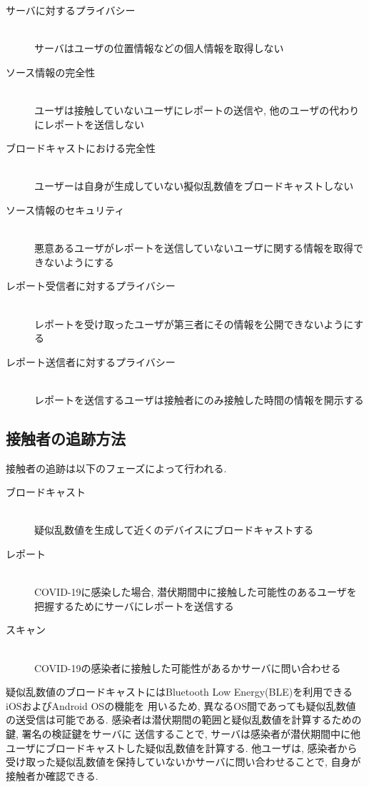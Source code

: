\documentclass[twocolumn,10pt]{ltjsarticle}
\begin{document}
\begin{description}
    \item[\textbullet サーバに対するプライバシー]~\\
    サーバはユーザの位置情報などの個人情報を取得しない
    \item[\textbullet ソース情報の完全性]~\\
    ユーザは接触していないユーザにレポートの送信や, 他のユーザの代わりにレポートを送信しない
    \item[\textbullet ブロードキャストにおける完全性]~\\ 
    ユーザーは自身が生成していない擬似乱数値をブロードキャストしない
    \item[\textbullet ソース情報のセキュリティ]~\\ 
    悪意あるユーザがレポートを送信していないユーザに関する情報を取得できないようにする
    \item[\textbullet レポート受信者に対するプライバシー]~\\ 
    レポートを受け取ったユーザが第三者にその情報を公開できないようにする
    \item[\textbullet レポート送信者に対するプライバシー]~\\ 
    レポートを送信するユーザは接触者にのみ接触した時間の情報を開示する
\end{description}

\subsection{接触者の追跡方法}
接触者の追跡は以下のフェーズによって行われる. 

\begin{description}
    \item[\textbullet ブロードキャスト]~\\
    疑似乱数値を生成して近くのデバイスにブロードキャストする
    \item[\textbullet レポート]~\\
    COVID-19に感染した場合, 潜伏期間中に接触した可能性のあるユーザを把握するためにサーバにレポートを送信する
    \item[\textbullet スキャン]~\\ 
    COVID-19の感染者に接触した可能性があるかサーバに問い合わせる
\end{description}

疑似乱数値のブロードキャストにはBluetooth Low Energy(BLE)を利用できるiOSおよびAndroid OSの機能を
用いるため, 異なるOS間であっても疑似乱数値の送受信は可能である. 
感染者は潜伏期間の範囲と疑似乱数値を計算するための鍵, 署名の検証鍵をサーバに
送信することで, サーバは感染者が潜伏期間中に他ユーザにブロードキャストした疑似乱数値を計算する. 
他ユーザは, 感染者から受け取った疑似乱数値を保持していないかサーバに問い合わせることで, 自身が接触者か確認できる. 
\end{document}
